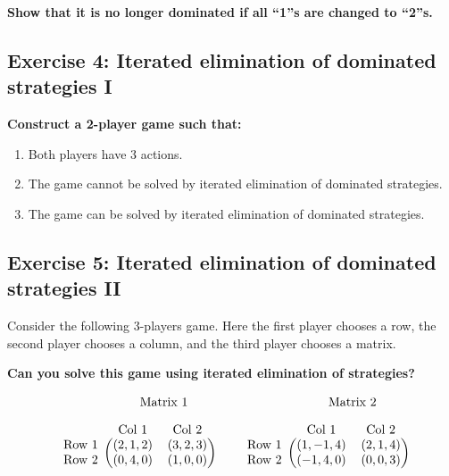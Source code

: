 \documentclass[10pt]{article}
\begin{document}
\textbf{Show that it is no longer dominated if all ``1''s are changed to ``2''s.}

\subsection*{Exercise 4: Iterated elimination of dominated strategies I}

\textbf{Construct a 2-player game such that:}

\begin{enumerate}
    \item Both players have 3 actions.
    \item The game cannot be solved by iterated elimination of dominated strategies.
    \item The game can be solved by iterated elimination of dominated strategies.
\end{enumerate}

\subsection*{Exercise 5: Iterated elimination of dominated strategies II}
Consider the following 3-players game. Here the first player chooses a row,
the second player chooses a column, and the third player chooses a matrix.

\textbf{Can you solve this game using iterated elimination of strategies?}

\begin{equation*}
\begin{blockarray}{ccc}
    & \BAmulticolumn{2}{c}{\text{Matrix } 1} \\ [1em]
    & \text{Col } 1 & \text{Col } 2 \\
    \begin{block}{c(cc)}
        \text{Row } 1 & (2, 1, 2) & (3, 2, 3) \\
        \text{Row } 2 & (0, 4, 0) & (1, 0, 0) \\
    \end{block}
\end{blockarray}\qquad
%
\begin{blockarray}{ccc}
    & \BAmulticolumn{2}{c}{\text{Matrix } 2} \\ [1em]
    & \text{Col } 1 & \text{Col } 2 \\
    \begin{block}{c(cc)}
        \text{Row } 1 & (1, -1, 4) & (2, 1, 4) \\
        \text{Row } 2 & (-1, 4, 0) & (0, 0, 3) \\
    \end{block}
\end{blockarray}
\end{equation*}
\end{document}
